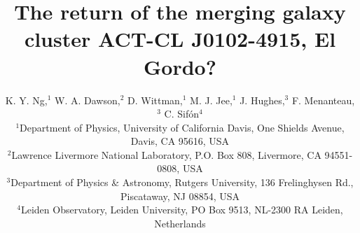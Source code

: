 

\title[The return of the merging galaxy cluster ACT-CL J0102-4915, El
Gordo?]
{The return of the merging galaxy cluster ACT-CL J0102-4915, El Gordo?}
\author[K. Y. Ng et al.]{K. Y. Ng,$^{1}$
	W. A. Dawson,$^{2}$ 
	D. Wittman,$^{1}$
	M. J. Jee,$^{1}$ 
	J. Hughes,$^{3}$ 
	F. Menanteau,$^{3}$
	\newauthor
	C. Sif\'{o}n$^{4}$\\
$^{1}$Department of Physics, University of California Davis, One Shields
Avenue, Davis, CA 95616, USA\\ 
$^{2}$Lawrence Livermore National Laboratory, P.O. Box 808, Livermore, CA 94551-0808, USA \\
$^3$Department of Physics \& Astronomy,
Rutgers University, 136 Frelinghysen Rd., Piscataway, NJ 08854, USA\\
$^{4}$Leiden Observatory, Leiden University, PO Box 9513, NL-2300 RA
Leiden, Netherlands\\}

